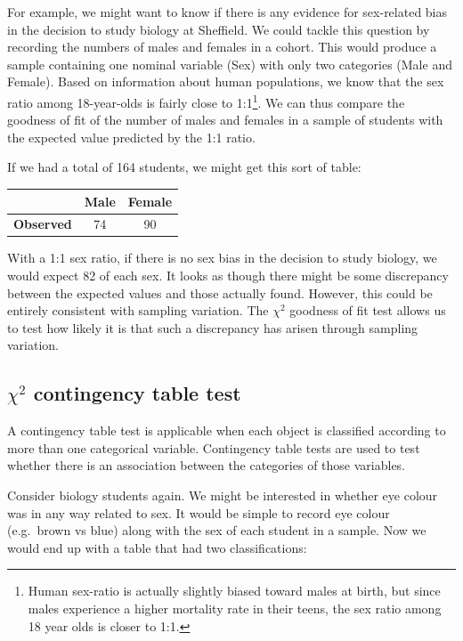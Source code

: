 \documentclass[
]{book}
\begin{document}
For example, we might want to know if there is any evidence for sex-related bias in the decision to study biology at Sheffield. We could tackle this question by recording the numbers of males and females in a cohort. This would produce a sample containing one nominal variable (Sex) with only two categories (Male and Female). Based on information about human populations, we know that the sex ratio among 18-year-olds is fairly close to 1:1\footnote{Human sex-ratio is actually slightly biased toward males at birth, but since males experience a higher mortality rate in their teens, the sex ratio among 18 year olds is closer to 1:1.}. We can thus compare the goodness of fit of the number of males and females in a sample of students with the expected value predicted by the 1:1 ratio.

If we had a total of 164 students, we might get this sort of table:

\begin{longtable}[]{@{}lcc@{}}
\toprule()
& Male & Female \\
\midrule()
\endhead
\textbf{Observed} & 74 & 90 \\
\bottomrule()
\end{longtable}

With a 1:1 sex ratio, if there is no sex bias in the decision to study biology, we would expect 82 of each sex. It looks as though there might be some discrepancy between the expected values and those actually found. However, this could be entirely consistent with sampling variation. The \(\chi^{2}\) goodness of fit test allows us to test how likely it is that such a discrepancy has arisen through sampling variation.

\hypertarget{chi2-contingency-table-test}{%
\subsection{\texorpdfstring{\(\chi^{2}\) contingency table test}{\textbackslash chi\^{}\{2\} contingency table test}}\label{chi2-contingency-table-test}}

A contingency table test is applicable when each object is classified according to more than one categorical variable. Contingency table tests are used to test whether there is an association between the categories of those variables.

Consider biology students again. We might be interested in whether eye colour was in any way related to sex. It would be simple to record eye colour (e.g.~brown vs blue) along with the sex of each student in a sample. Now we would end up with a table that had two classifications:
\end{document}
